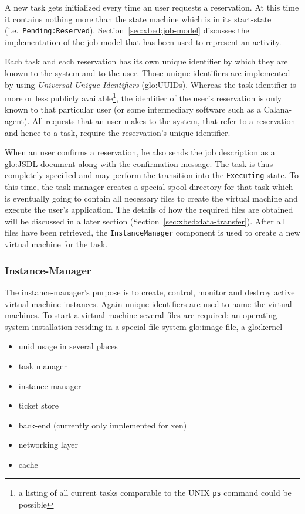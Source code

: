 A new task gets initialized every  time an user requests a reservation. At
this time it contains nothing more  than the state machine which is in its
start-state                               (i.e.~\texttt{Pending:Reserved}).
Section~\ref{sec:xbed:job-model}  discusses   the  implementation  of  the
job-model that has been used to  represent an activity.

Each task and each reservation has its own unique identifier by which they
are known  to the system  and to the  user.  Those unique  identifiers are
implemented     by    using     \emph{Universal     Unique    Identifiers}
(\gls{glo:UUID}s).  Whereas  the task identifier is more  or less publicly
available\footnote{a listing  of all current tasks comparable  to the UNIX
  \texttt{ps}  command could be  possible}, the  identifier of  the user's
reservation is  only known to  that particular user (or  some intermediary
software such as  a Calana-agent). All requests that an  user makes to the
system,  that refer  to a  reservation and  hence to  a task,  require the
reservation's unique identifier.

When an user confirms a reservation,  he also sends the job description as
a \gls{glo:JSDL}  document along with the confirmation  message.  The task
is  thus completely  specified and  may  perform the  transition into  the
\texttt{Executing} state. To this time, the task-manager creates a special
spool directory  for that  task which is  eventually going to  contain all
necessary  files to  create the  virtual  machine and  execute the  user's
application. The  details of how the  required files are  obtained will be
discussed  in   a  later  section  (Section~\ref{sec:xbed:data-transfer}).
After  all   files  have  been   retrieved,  the  \texttt{InstanceManager}
component is used to create a new virtual machine for the task.

\subsubsection{Instance-Manager}

The instance-manager's purpose is  to create, control, monitor and destroy
active virtual  machine instances.  Again  unique identifiers are  used to
name the  virtual machines. To start  a virtual machine  several files are
required:  an   operating  system  installation  residing   in  a  special
file-system \gls{glo:image} file, a \gls{glo:kernel}

\begin{itemize}
\item uuid usage in several places
\item task manager
\item instance manager
\item ticket store
\item back-end (currently only implemented for xen)
\item networking layer
\item cache
\end{itemize}

